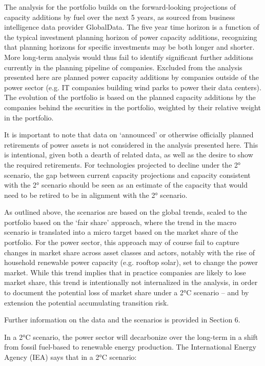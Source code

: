 \documentclass[10pt,table,a4]{article}\usepackage[]{graphicx}\usepackage[]{color}
\begin{document}
	
	\begin{multicols}{2}
		
		The analysis for the portfolio builds on the forward-looking projections of capacity additions by fuel over the next 5 years, as sourced from business intelligence data provider GlobalData. The five year time horizon is a function of the typical investment planning horizon of power capacity additions, recognizing that planning horizons for specific investments may be both longer and shorter. More long-term analysis would thus fail to identify significant further additions currently in the planning pipeline of companies. Excluded from the analysis presented here are planned power capacity additions by companies outside of the power sector (e.g. IT companies building wind parks to power their data centers). The evolution of the portfolio is based on the planned capacity additions by the companies behind the securities in the portfolio, weighted by their relative weight in the portfolio. 
		
		It is important to note that data on ‘announced’ or otherwise officially planned retirements of power assets is not considered in the analysis presented here. This is intentional, given both a dearth of related data, as well as the desire to show the required retirements. For technologies projected to decline under the 2° scenario, the gap between current capacity projections and capacity consistent with the 2° scenario should be seen as an estimate of the capacity that would need to be retired to be in alignment with the 2° scenario. 
		
		As outlined above, the scenarios are based on the global trends, scaled to the portfolio based on the ‘fair share’ approach, where the trend in the macro scenario is translated into a micro target based on the market share of the portfolio. For the power sector, this approach may of course fail to capture changes in market share across asset classes and actors, notably with the rise of household renewable power capacity (e.g. rooftop solar), set to change the power market. While this trend implies that in practice companies are likely to lose market share, this trend is intentionally not internalized in the analysis, in order to document the potential loss of market share under a 2°C scenario – and by extension the potential accumulating transition risk.
		
		Further information on the data and the scenarios is provided in Section 6. 
		
		In a 2°C scenario, the power sector will decarbonize over the long-term in a shift from fossil fuel-based to renewable energy production. The International Energy Agency (IEA) says that in a 2°C scenario:
		

\end{multicols}
\end{document}
